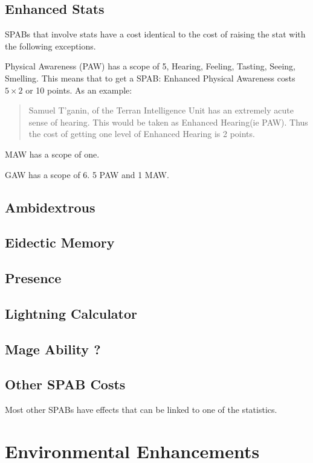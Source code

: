 \subsection{Enhanced Stats}
SPABs that involve stats have a cost identical to the cost of raising
the stat with the following exceptions.

Physical Awareness (PAW) has a scope of 5, Hearing, Feeling, Tasting, 
Seeing, Smelling. This means that to get a SPAB: Enhanced Physical
Awareness costs \( 5 \times 2 \) or 10 points. As an example:

\begin{quote}
Samuel T'ganin, of the Terran Intelligence Unit has an extremely acute 
sense of hearing. This would be taken as Enhanced Hearing(ie PAW). 
Thus the cost of getting one level of Enhanced Hearing is 2 points. 
\end{quote} 

MAW has a scope of one. 

GAW has a scope of 6. 5 PAW and 1 MAW.

\subsection{Ambidextrous}
\subsection{Eidectic Memory}
\subsection{Presence}
\subsection{Lightning Calculator}
\subsection{Mage Ability ?}
\subsection{Other SPAB Costs}

Most other SPABs have effects that can be linked to one of the
statistics. 

\section{Environmental Enhancements}

